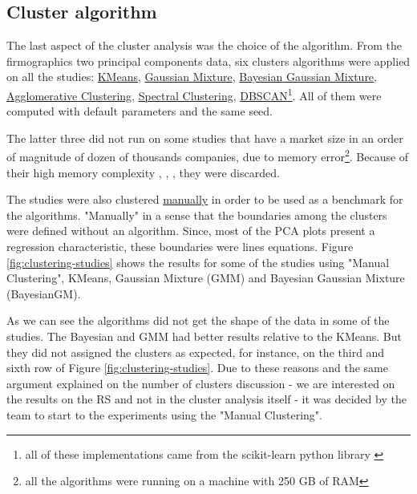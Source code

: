 \subsection{Cluster algorithm}

The last aspect of the cluster analysis was the choice of the algorithm. From the firmographics two principal components data, six clusters algorithms were applied on all the studies: \underline{KMeans}, \underline{Gaussian Mixture}, \underline{Bayesian Gaussian Mixture}, \underline{Agglomerative Clustering}, \underline{Spectral Clustering}, \underline{DBSCAN}\footnote{all of these implementations came from the scikit-learn python library \cite{scikit-learn}}. All of them were computed with default parameters and the same seed.

The latter three did not run on some studies that have a market size in an order of magnitude of dozen of thousands companies, due to memory error\footnote{all the algorithms were running on a machine with 250 GB of RAM}. Because of their high memory complexity \cite{franti2006fast}, \cite{ester1996density}, \cite{yan2009fast}, they were discarded.

The studies were also clustered \underline{manually} in order to be used as a benchmark for the algorithms. "Manually" in a sense that the boundaries among the clusters were defined without an algorithm. Since, most of the PCA plots present a regression characteristic, these boundaries were lines equations. Figure \ref{fig:clustering-studies} shows the results for some of the studies using "Manual Clustering", KMeans, Gaussian Mixture (GMM) and Bayesian Gaussian Mixture (BayesianGM).

As we can see the algorithms did not get the shape of the data in some of the studies. The Bayesian and GMM had better results relative to the KMeans. But they did not assigned the clusters as expected, for instance, on the third and sixth row of Figure \ref{fig:clustering-studies}. Due to these reasons and the same argument explained on the number of clusters discussion - we are interested on the results on the RS and not in the cluster analysis itself - it was decided by the team to start to the experiments using the "Manual Clustering".

